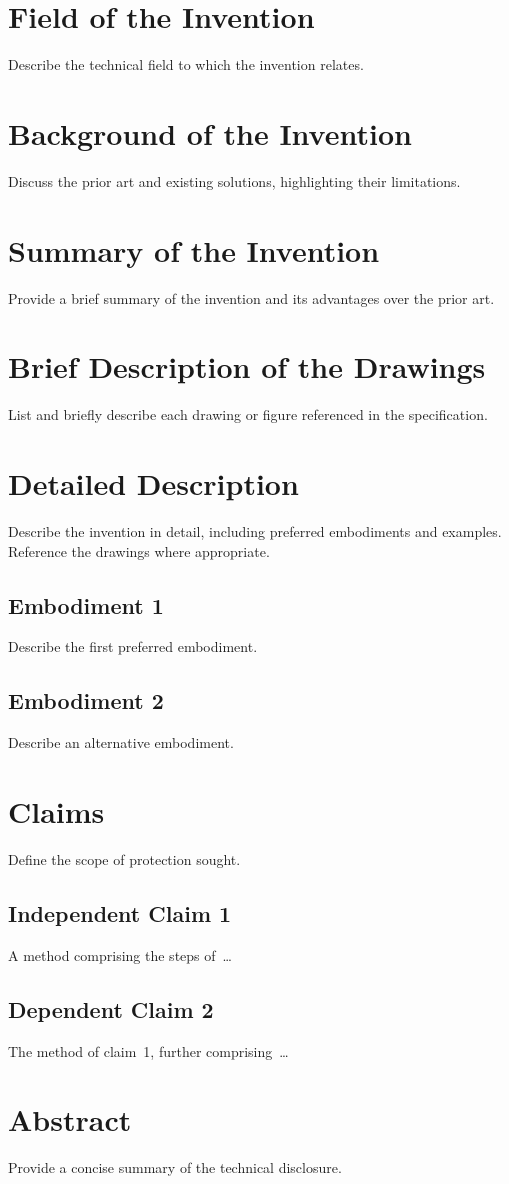 \documentclass[
    language=english,
    doctype=patent,
    institution=none,
    titlestyle=book,
    oneside,
]{../../omnilatex}
\begin{document}
\maketitle

\tableofcontents

\section{Field of the Invention}
Describe the technical field to which the invention relates.

\section{Background of the Invention}
Discuss the prior art and existing solutions, highlighting their limitations.

\section{Summary of the Invention}
Provide a brief summary of the invention and its advantages over the prior art.

\section{Brief Description of the Drawings}
List and briefly describe each drawing or figure referenced in the specification.

\section{Detailed Description}
Describe the invention in detail, including preferred embodiments and examples.
Reference the drawings where appropriate.

\subsection{Embodiment 1}
Describe the first preferred embodiment.

\subsection{Embodiment 2}
Describe an alternative embodiment.

\section{Claims}
Define the scope of protection sought.

\subsection{Independent Claim 1}
A method comprising the steps of~\ldots

\subsection{Dependent Claim 2}
The method of claim~1, further comprising~\ldots

\section{Abstract}
Provide a concise summary of the technical disclosure.
\end{document}
